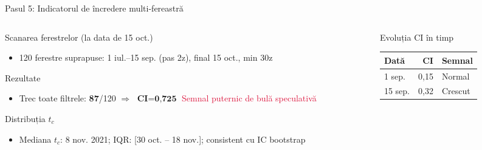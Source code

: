 \documentclass[9pt, aspectratio=169, t]{beamer}
\begin{document}
\begin{frame}{Pasul 5: Indicatorul de încredere multi-fereastră}
    \begin{cminipage}{0.95\textwidth}
    {\scriptsize
    \begin{columns}[T]
        \begin{column}{0.47\textwidth}
            \begin{block}{Scanarea ferestrelor (la data de 15 oct.)}
                \begin{itemize}\setlength{\itemsep}{0pt}
                    \item 120 ferestre suprapuse: 1 iul.--15 sep. (pas 2z), final 15 oct., min 30z
                \end{itemize}
            \end{block}
            \vspace{-2mm}
            \begin{alertblock}{Rezultate}
                \begin{itemize}\setlength{\itemsep}{0pt}
                    \item Trec toate filtrele: \textbf{87}/120 $\Rightarrow$ $\textbf{CI} = \textbf{0{,}725}$ \textcolor{Crimson}{Semnal puternic de bulă speculativă}
                \end{itemize}
            \end{alertblock}
            \vspace{-2mm}
            \begin{exampleblock}{Distribuția $t_c$}
                \begin{itemize}\setlength{\itemsep}{0pt}
                    \item Mediana $t_c$: 8 nov. 2021; IQR: [30 oct. -- 18 nov.]; consistent cu IC bootstrap
                \end{itemize}
            \end{exampleblock}
        \end{column}
        \begin{column}{0.47\textwidth}
            \begin{block}{Evoluția CI în timp}
                {\scriptsize
                \begin{tabular}{lrl}
                    \toprule
                    \textbf{Dată} & \textbf{CI} & \textbf{Semnal} \\
                    \midrule
                    1 sep. & 0,15 & Normal \\
                    15 sep. & 0,32 & Crescut \\

\end{tabular}}
\end{block}
\end{column}
\end{columns}}
\end{cminipage}
\end{frame}
\end{document}
